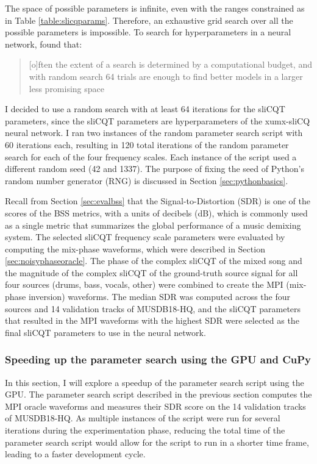 \documentclass[report.tex]{subfiles}
\begin{document}
The space of possible parameters is infinite, even with the ranges constrained as in Table \ref{table:slicqparams}. Therefore, an exhaustive grid search over all the possible parameters is impossible. To search for hyperparameters in a neural network, \textcite{randomgrid} found that:

\begin{quote}
	[o]ften the extent of a search is determined by a computational budget, and with random search 64 trials are enough to find better models in a larger less promising space \parencite[293]{randomgrid}
\end{quote}

I decided to use a random search with at least 64 iterations for the sliCQT parameters, since the sliCQT parameters are hyperparameters of the xumx-sliCQ neural network. I ran two instances of the random parameter search script with 60 iterations each, resulting in 120 total iterations of the random parameter search for each of the four frequency scales. Each instance of the script used a different random seed (42 and 1337). The purpose of fixing the seed of Python's random number generator (RNG) is discussed in Section \ref{sec:pythonbasics}.

Recall from Section \ref{sec:evalbss} that the Signal-to-Distortion (SDR) is one of the scores of the BSS metrics, with a units of decibels (dB), which is commonly used as a single metric that summarizes the global performance of a music demixing system. The selected sliCQT frequency scale parameters were evaluated by computing the mix-phase waveforms, which were described in Section \ref{sec:noisyphaseoracle}. The phase of the complex sliCQT of the mixed song and the magnitude of the complex sliCQT of the ground-truth source signal for all four sources (drums, bass, vocals, other) were combined to create the MPI (mix-phase inversion) waveforms. The median SDR was computed across the four sources and 14 validation tracks of MUSDB18-HQ, and the sliCQT parameters that resulted in the MPI waveforms with the highest SDR were selected as the final sliCQT parameters to use in the neural network.

\subsubsection{Speeding up the parameter search using the GPU and CuPy}
\label{sec:fasterbsscupy}

In this section, I will explore a speedup of the parameter search script using the GPU.  The parameter search script described in the previous section computes the MPI oracle waveforms and measures their SDR score on the 14 validation tracks of MUSDB18-HQ. As multiple instances of the script were run for several iterations during the experimentation phase, reducing the total time of the parameter search script would allow for the script to run in a shorter time frame, leading to a faster development cycle.
\end{document}
